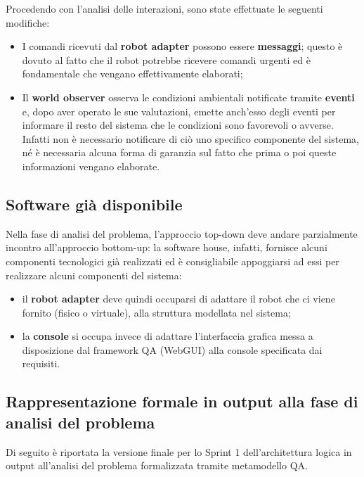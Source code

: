 Procedendo con l'analisi delle interazioni, sono state effettuate le seguenti modifiche:
\begin{itemize}
    \item
      I comandi ricevuti dal \textbf{robot adapter} possono essere \textbf{messaggi};
      questo è dovuto al fatto che il robot potrebbe ricevere comandi urgenti ed è fondamentale che vengano effettivamente elaborati;
    \item
      Il \textbf{world observer} osserva le condizioni ambientali notificate tramite \textbf{eventi} e,
      dopo aver operato le sue valutazioni, emette anch'esso degli eventi per informare il resto del sistema che le condizioni sono favorevoli o avverse.
      Infatti non è necessario notificare di ciò uno specifico componente del sistema, né è necessaria alcuna forma di garanzia sul fatto che prima o poi queste informazioni vengano elaborate.
\end{itemize}

\subsection{Software già disponibile}

Nella fase di analisi del problema, l'approccio top-down deve andare parzialmente incontro all'approccio bottom-up:
la software house, infatti, fornisce alcuni componenti tecnologici già realizzati ed è consigliabile appoggiarsi ad essi per realizzare alcuni componenti del sistema:

\begin{itemize}
    \item il \textbf{robot adapter} deve quindi occuparsi di adattare il robot che ci viene fornito (fisico o virtuale), alla struttura modellata nel sistema;
    \item la \textbf{console} si occupa invece di adattare l'interfaccia grafica messa a disposizione dal framework QA (WebGUI) alla console specificata dai requisiti.
\end{itemize}

\subsection[Rappresentazione formale]{Rappresentazione formale in output alla fase di analisi del problema}

Di seguito è riportata la versione finale per lo Sprint 1 dell'architettura logica in output all'analisi del problema formalizzata tramite metamodello QA\@.


